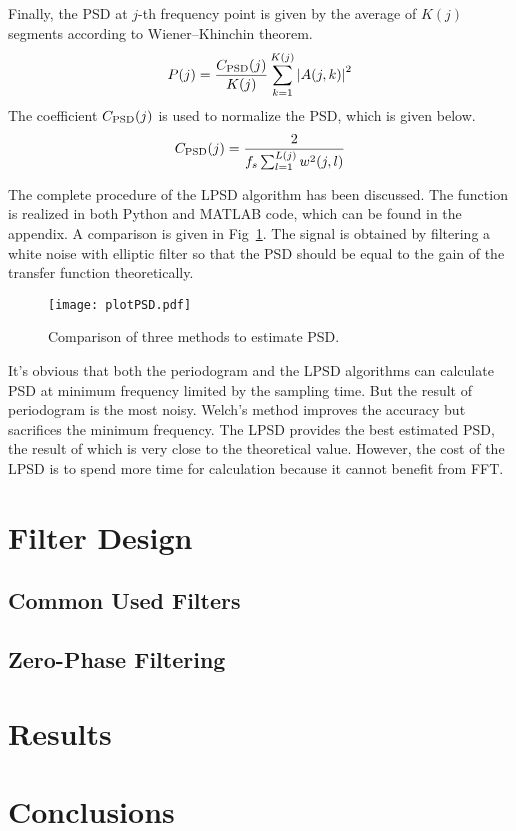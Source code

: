 Finally, the PSD at $j$-th frequency point is given by the average of $K(j)$ segments according to Wiener–Khinchin theorem.
\begin{equation}
    P(j) = \frac{C_{\rm PSD}(j)}{K(j)} \sum_{k=1}^{K(j)} \left| A(j,k) \right|^2
\end{equation}
The coefficient $C_{\rm PSD}(j)$ is used to normalize the PSD, which is given below.
\begin{equation}
    C_{\rm PSD}(j) = \frac{2}{f_s\sum_{l=1}^{L(j)} w^2(j,l)}
\end{equation}


The complete procedure of the LPSD algorithm has been discussed. The function is realized in both Python and MATLAB code, which can be found in the appendix. A comparison is given in Fig~\ref{fig:plotPSD}. The signal is obtained by filtering a white noise with elliptic filter so that the PSD should be equal to the gain of the transfer function theoretically.


\begin{figure}[!htb]
    \centering
    \texttt{[image: plotPSD.pdf]}
    \caption{Comparison of three methods to estimate PSD.}
    \label{fig:plotPSD}
\end{figure}


It's obvious that both the periodogram and the LPSD algorithms can calculate PSD at minimum frequency limited by the sampling time. But the result of periodogram is the most noisy. Welch's method improves the accuracy but sacrifices the minimum frequency. The LPSD provides the best estimated PSD, the result of which is very close to the theoretical value. However, the cost of the LPSD is to spend more time for calculation because it cannot benefit from FFT.

\section{Filter Design}





\subsection{Common Used Filters}




\subsection{Zero-Phase Filtering}




\section{Results}




\section{Conclusions}





